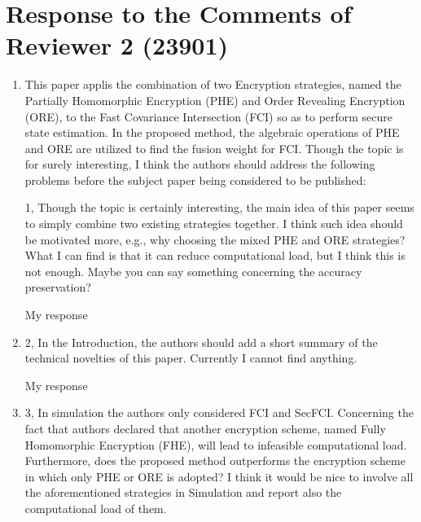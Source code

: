 \documentclass[a4paper]{scrartcl}
\newenvironment{rebuttal}{\begin{enumerate}[label={\color{grey}\thesection.\arabic{enumi}},leftmargin=0pt,ref=\thesection.\arabic{enumi}]}{\end{enumerate}}
\newcommand{\reviewtext}[1]{{\color{nblue} #1}}
\begin{document}
\section*{Response to the Comments of Reviewer 2 (23901)}
\def\thesection{R2}
\begin{rebuttal}
\item \reviewtext{This paper applis the combination of two Encryption strategies, named
the Partially Homomorphic Encryption (PHE) 
and Order Revealing Encryption (ORE), to the Fast Covariance
Intersection (FCI) so as to perform secure state estimation. In the
proposed method, the algebraic operations of PHE and ORE are utilized
to find the fusion weight for FCI. Though the topic is for surely
interesting, I think the authors should address the following problems
before the subject paper being considered to be published:

1, Though the topic is certainly interesting, the main idea of this
paper seems to simply combine two existing strategies together. I think
such idea should be motivated more, e.g., why choosing the mixed PHE
and ORE strategies? What I can find is that it can reduce computational
load, but I think this is not enough. Maybe you can say something
concerning the accuracy preservation? }

My response

\item \reviewtext{2, In the Introduction, the authors should add a short summary of the
technical novelties of this paper. Currently I cannot find anything.}

My response

\item \reviewtext{3, In simulation the authors only considered FCI and SecFCI. Concerning
the fact that authors declared that another encryption scheme, named
Fully Homomorphic Encryption (FHE), will lead to infeasible
computational load. Furthermore, does the proposed method outperforms
the encryption scheme in which only PHE or ORE is adopted? I think it
would be nice to involve all the aforementioned strategies in
Simulation and report also the computational load of them.}


\end{rebuttal}
\end{document}
